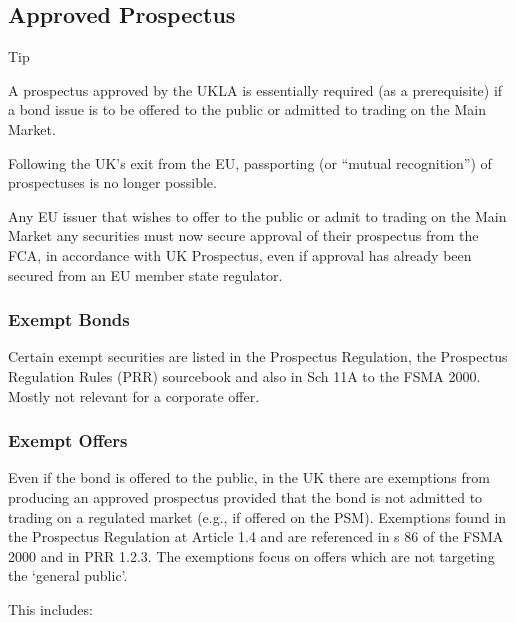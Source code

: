 \documentclass[
]{article}
\newenvironment{env-100773c6-502e-49a1-b0f0-49a30dbf5b8e}
{
    \savenotes\tcolorbox[blanker,breakable,left=5pt,borderline west={2pt}{-4pt}{cyan}]
}
{
    \endtcolorbox\spewnotes
}
\begin{document}
\hypertarget{approved-prospectus}{%
\subsection{Approved Prospectus}\label{approved-prospectus}}

\begin{env-100773c6-502e-49a1-b0f0-49a30dbf5b8e}

Tip

A prospectus approved by the UKLA is essentially required (as a
prerequisite) if a bond issue is to be offered to the public or admitted
to trading on the Main Market.

\end{env-100773c6-502e-49a1-b0f0-49a30dbf5b8e}

Following the UK's exit from the EU, passporting (or ``mutual
recognition'') of prospectuses is no longer possible.

Any EU issuer that wishes to offer to the public or admit to trading on
the Main Market any securities must now secure approval of their
prospectus from the FCA, in accordance with UK Prospectus, even if
approval has already been secured from an EU member state regulator.

\hypertarget{exempt-bonds}{%
\subsubsection{Exempt Bonds}\label{exempt-bonds}}

Certain exempt securities are listed in the Prospectus Regulation, the
Prospectus Regulation Rules (PRR) sourcebook and also in Sch 11A to the
FSMA 2000. Mostly not relevant for a corporate offer.

\hypertarget{exempt-offers}{%
\subsubsection{Exempt Offers}\label{exempt-offers}}

Even if the bond is offered to the public, in the UK there are
exemptions from producing an approved prospectus provided that the bond
is not admitted to trading on a regulated market (e.g., if offered on
the PSM). Exemptions found in the Prospectus Regulation at Article 1.4
and are referenced in s 86 of the FSMA 2000 and in PRR 1.2.3. The
exemptions focus on offers which are not targeting the `general public'.

This includes:
\end{document}
